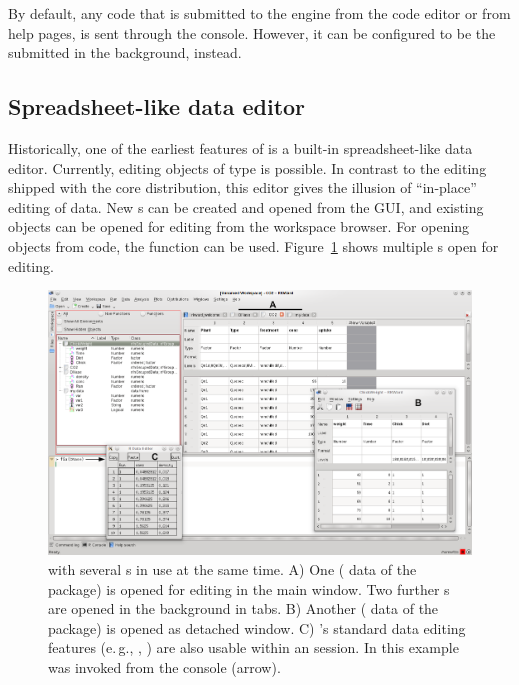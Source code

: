By default, any code that is submitted to the
 engine from the code editor or from help
pages, is sent through the  console.
However, it can be configured to be the submitted in the background,
instead.


\subsection{Spreadsheet-like data editor}
\label{sec:spreadsheet}

Historically, one of the earliest
features of  is a built-in spreadsheet-like data editor.
Currently, editing  objects of type
 is possible. In contrast to the  editing shipped
with the  core distribution, this editor
gives the illusion of ``in-place'' editing of data. New s can
be created and opened from the GUI, and existing objects can be opened
for editing from the workspace browser. For opening objects from
 code, the function  can be used.
Figure~\ref{fig:data_editors} shows multiple s open for editing.

\begin{figure}[b!]
 \centering
 \includegraphics[width=15.5cm]{./figures/data_editors.png}
 \caption{ with several s in use at the same time. A) 
  One  ( data of the  package) is opened for editing in the main window. Two further s
  are opened in the background in tabs. 
  B) Another  ( data of the  package) is opened as detached window. 
  C) 's standard data editing features (e.\,g., , ) 
  are also usable within an  session. In this example  
  was invoked from the console (arrow).}
 \label{fig:data_editors}
\end{figure}


